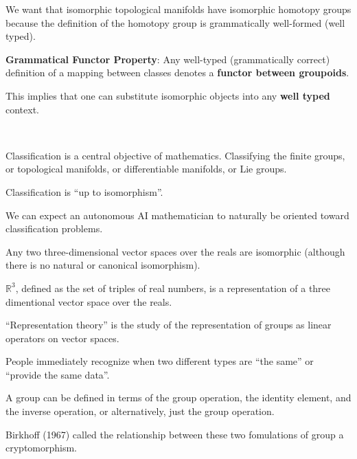 {\vfill
We want that isomorphic topological manifolds have isomorphic homotopy groups because the definition of the homotopy group is grammatically well-formed (well typed).


{\bf Grammatical Functor Property}: Any well-typed (grammatically correct) definition of a mapping between classes denotes a {\bf functor between groupoids}.

\vfill
This implies that one can substitute isomorphic objects into any {\bf well typed} context.

\vfill

~ \hfill\unnamed
    {
    }{
      }
\hfill ~

\vfill


Classification is a central objective of mathematics.  Classifying the finite groups, or topological manifolds, or differentiable manifolds, or Lie groups.

\vfill
Classification is ``up to isomorphism''.

\vfill
We can expect an autonomous AI mathematician to naturally be oriented toward classification problems.


Any two three-dimensional vector spaces over the reals are isomorphic (although there is no natural or canonical isomorphism).

\vfill
$\mathbb{R}^3$, defined as the set of triples of real numbers, is a representation of a three dimentional vector space over the reals.

\vfill
``Representation theory'' is the study of the representation of groups as linear operators on vector spaces.


People immediately recognize when two different types are ``the same'' or ``provide the same data''.

\vfill
A group can be defined in terms of the group operation, the identity element, and the inverse operation, or alternatively, just
the group operation.

\vfill
Birkhoff (1967) called the relationship between these two fomulations of group a cryptomorphism.

}
